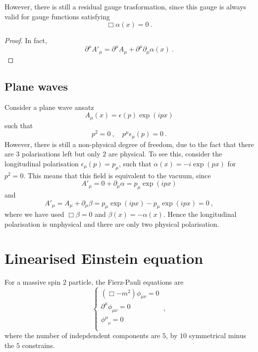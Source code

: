     However, there is still a residual gauge trasformation, since this gauge is always valid for gauge functions satisfying 
    \begin{equation*}
        \Box \alpha (x) = 0~.
    \end{equation*}
    \begin{proof}
        In fact,
        \begin{equation*}
            \partial^\mu {A'}_\mu = \partial^\mu A_\mu + \partial^\mu \partial_\mu \alpha (x) ~.
        \end{equation*}
    \end{proof}

\section{Plane waves}

    Consider a plane wave ansatz 
    \begin{equation*}
        A_\mu (x) = \epsilon (p) \exp(i p x)
    \end{equation*}
    such that
    \begin{equation*}
        p^2 = 0 ~, \quad p^\mu \epsilon_\mu (p) = 0 ~.
    \end{equation*}
    However, there is still a non-physical degree of freedom, due to the fact that there are $3$ polarisations left but only $2$ are physical. To see this, consider the longitudinal polarisation $\epsilon_\mu (p) = p_\mu$, such that $\alpha(x) = - i \exp(p x)$ for $p^2 = 0$. This means that this field is equivalent to the vacuum, since
    \begin{equation*}
        {A'}_\mu = 0 + \partial_\mu \alpha = p_\mu \exp(ipx) 
    \end{equation*}
    and 
    \begin{equation*}
        {A'}_\mu = A_\mu + \partial_\mu \beta = p_\mu \exp(i p x) - p_\mu \exp(i p x) = 0~,
    \end{equation*}
    where we have used $\Box \beta = 0$ and $\beta (x) = - \alpha (x)$. Hence the longitudinal polarisation is unphysical and there are only two physical polarisation.

\chapter{Linearised Einstein equation}  

    For a massive spin $2$ particle, the Fierz-Pauli equations are 
    \begin{equation*}
        \begin{cases}
            (\Box - m^2) \phi_{\mu\nu} = 0 \\
            \partial^\mu \phi_{\mu\nu} = 0 \\
            \phi^\mu_{\phantom \mu \nu} = 0 \\
        \end{cases} ~,
    \end{equation*}
    where the number of indepdendent components are $5$, by $10$ symmetrical minus the $5$ constrains. 

